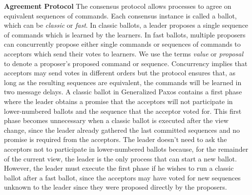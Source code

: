 \textbf{Agreement Protocol} The consensus protocol allows processes to agree on equivalent sequences of commands. Each consensus instance is called a ballot, which can be \textit{classic} or \textit{fast}. In classic ballots, a leader proposes a single sequence of commands which is learned by the learners. In fast ballots, multiple proposers can concurrently propose either single commands or sequences of commands to acceptors which send their votes to learners. We use the terms \textit{value} or \textit{proposal} to denote a proposer's proposed command or sequence. Concurrency implies that acceptors may send votes in different orders but the protocol ensures that, as long as the resulting sequences are equivalent, the commands will be learned in two message delays. A classic ballot in Generalized Paxos contains a first phase where the leader obtains a promise that the acceptors will not participate in lower-numbered ballots and the sequence that the acceptor voted for. This first phase becomes unnecessary when a classic ballot is executed after the view change, since the leader already gathered the last committed sequences and no promise is required from the acceptors. The leader doesn't need to ask the acceptors not to participate in lower-numbered ballots because, for the remainder of the current view, the leader is the only process that can start a new ballot.  However, the leader must execute the first phase if he wishes to run a classic ballot after a fast ballot, since the acceptors may have voted for new sequences unknown to the leader since they were proposed directly by the proposers. \par
